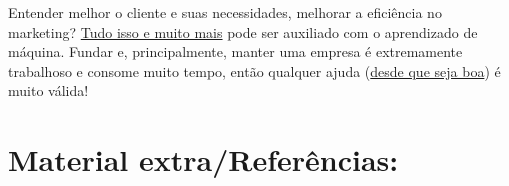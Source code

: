 \documentclass[12pt]{article}
\begin{document}
           Entender melhor o cliente e suas necessidades, melhorar a eficiência no
marketing? \href{https://forbes.com.br/negocios/2019/09/15-maneiras-como-o-machine-learnings-ajuda-nos-negocios/#foto11}{Tudo isso e muito mais} pode ser auxiliado com o
aprendizado de máquina. Fundar e, principalmente, manter uma
empresa é extremamente trabalhoso e consome muito tempo, então
qualquer ajuda (\href{https://epocanegocios.globo.com/Tecnologia/noticia/2019/02/startup-usa-ciencia-de-dados-para-prever-o-futuro-das-empresas-e-ajuda-las-lucrar-mais.html}{desde que seja boa}) é muito válida!

        
            \section*{\centering Material extra/Referências:}\label{sec:Extra_Referencias}

\
           
\end{document}
